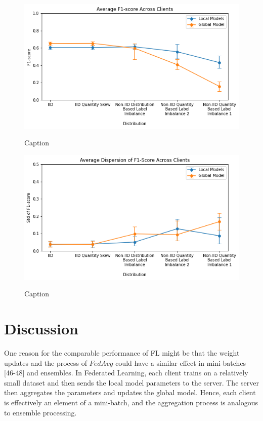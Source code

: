 \documentclass[letterpaper]{article} %
\begin{document}
\begin{figure}[h]
{\includegraphics[width=\columnwidth]{Avg_f1_score_of_local_models_against_that_of_global_model}}
\caption{Caption}
\end{figure}

\begin{figure}[h]
{\includegraphics[width=\columnwidth]{Avg_dispersion_of_f1_score_of_local_models_against_that_of_global_model}}
\caption{Caption}
\end{figure}

\bigskip
\section{Discussion}

One reason for the comparable performance of FL might be that
the weight updates and the process of $FedAvg$ could have a similar effect in mini-batches [46-48] and ensembles. In Federated Learning, each client trains on a relatively small dataset and then
sends the local model parameters to the server. The server then aggregates the parameters and updates the global model. Hence, each client is effectively an element of a mini-batch, and the aggregation process is analogous to ensemble processing.
\end{document}
